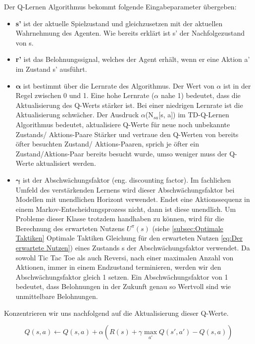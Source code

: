 Der Q-Lernen Algorithmus bekommt folgende Eingabeparameter übergeben:

\begin{itemize}
\item \textbf{s'} ist der aktuelle Spielzustand und gleichzusetzen mit der aktuellen Wahrnehmung des Agenten. Wie bereits erklärt ist s' der Nachfolgezustand von s.

\item \textbf{r'} ist das Belohnungssignal, welches der Agent erhält, wenn er eine Aktion a' im Zustand s' ausführt. 

\item $\boldsymbol{\alpha}$ ist bestimmt über die Lernrate des Algorithmus. Der Wert von $\alpha$ ist in der Regel zwischen 0 und 1. Eine hohe Lernrate ($\alpha$ nahe 1) bedeutet, dass die Aktualisierung des Q-Werts stärker ist. Bei einer niedrigen Lernrate ist die Aktualisierung schwächer. Der Ausdruck $\alpha$(N$_{sa}$[s, a]) im TD-Q-Lernen Algorithmus bedeutet, aktualisiere Q-Werte für neue noch unbekannte Zustands/ Aktions-Paare Stärker und vertraue den Q-Werten von bereits öfter besuchten Zustand/ Aktions-Paaren, sprich je öfter ein Zustand/Aktions-Paar bereits besucht wurde, umso weniger muss der Q-Werte aktualisiert werden.

\item $\boldsymbol{\gamma}$ ist der Abschwächungsfaktor (eng. discounting factor). Im fachlichen Umfeld des verstärkenden Lernens wird dieser Abschwächungsfaktor bei Modellen mit unendlichen Horizont verwendet. Endet eine Aktionssequenz in einem Markov-Entscheidungsprozess nicht, dann ist diese unendlich. Um Probleme dieser Klasse trotzdem handhaben zu können, wird für die Berechnung des erwarteten Nutzens $U^\pi(s)$ (siehe \ref{subsec:Optimale Taktiken} Optimale Taktiken Gleichung für den erwarteten Nutzen \ref{eq:Der erwartete Nutzen}) eines Zustands s der Abschwächungsfaktor verwendet. Da sowohl Tic Tac Toe als auch Reversi, nach einer maximalen Anzahl von Aktionen, immer in einem Endzustand terminieren, werden wir den Abschwächungsfaktor gleich 1 setzen. Ein Abschwächungsfaktor von 1 bedeutet, dass Belohnungen in der Zukunft genau so Wertvoll sind wie unmittelbare Belohnungen. 
\end{itemize} 

Konzentrieren wir uns nachfolgend auf die Aktualisierung dieser Q-Werte.

\begin{equation} \label{eq:TD-Q-Aktualisierungsgleichung}
Q(s,a) \leftarrow Q(s,a) + \alpha(R(s) + \gamma \max_{a'} Q(s', a') - Q(s,a))
\end{equation}